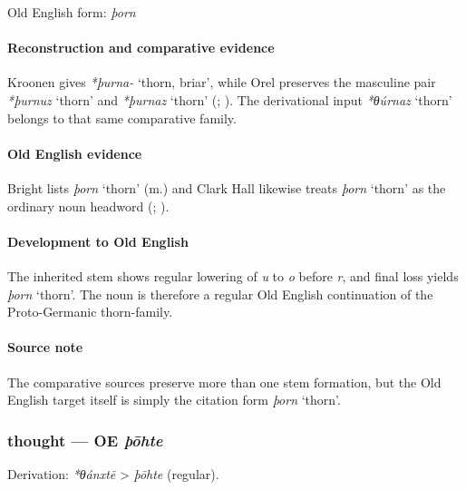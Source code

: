 \documentclass[
  british,
  a4paper,
]{article}
\providecommand{\Recon}[1]{\emph{*#1}}
\begin{document}
Old English form: \emph{þorn}

\paragraph{Reconstruction and comparative
evidence}\label{reconstruction-and-comparative-evidence-65}

Kroonen gives \emph{*þurna-} `thorn, briar', while Orel preserves the
masculine pair \Recon{þurnuz} `thorn' and \Recon{þurnaz} `thorn'
(; ). The derivational input \Recon{θúrnaz} `thorn' belongs to that
same comparative family.

\paragraph{Old English evidence}\label{old-english-evidence-67}

Bright lists \emph{þorn} `thorn' (m.) and Clark Hall likewise treats
\emph{þorn} `thorn' as the ordinary noun headword
(;
).

\paragraph{Development to Old
English}\label{development-to-old-english-66}

The inherited stem shows regular lowering of \emph{u} to \emph{o} before
\emph{r}, and final loss yields \emph{þorn} `thorn'. The noun is
therefore a regular Old English continuation of the Proto-Germanic
thorn-family.

\paragraph{Source note}\label{source-note-5}

The comparative sources preserve more than one stem formation, but the
Old English target itself is simply the citation form \emph{þorn}
`thorn'.

\subsubsection{\texorpdfstring{thought --- OE
\emph{þōhte}}{thought --- OE þōhte}}\label{thought-oe-uxfeux14dhte}

Derivation: \emph{*θánxtē} \textgreater{} \emph{þōhte} (regular).
\end{document}
